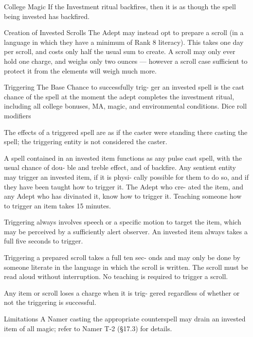 \begin{Chapter}{College Magic}
If  the  Investment  ritual  backfires,  then  it  is  as 
though the spell being invested has backfired. 

Creation  of  Invested  Scrolls  The  Adept  may 
instead  opt  to  prepare  a  scroll  (in  a  language  in 
which  they  have  a  minimum  of  Rank  8  literacy). 
This  takes  one  day  per  scroll,  and  costs  only  half 
the  usual  sum  to  create.  A  scroll  may  only  ever 
hold  one  charge,  and  weighs  only  two  ounces  — 
however  a  scroll  case  sufficient  to  protect  it  from 
the elements will weigh much more. 

Triggering  The  Base  Chance  to  successfully  trig-
ger an invested spell is the cast chance of the spell 
at the  moment the  adept  completes  the  investment 
ritual,  including  all  college  bonuses,  MA,  magic, 
and  environmental  conditions.  Dice  roll  modifiers 

The  effects  of  a  triggered  spell  are  as  if  the  caster 
were standing there casting the spell; the triggering 
entity is not considered the caster. 

A  spell  contained in  an  invested  item functions  as 
any pulse cast spell, with the usual chance of dou-
ble and treble effect, and of backfire. Any sentient 
entity  may  trigger  an  invested  item,  if  it  is  physi-
cally  possible  for  them  to  do  so,  and  if  they  have 
been taught how to trigger it. The  Adept who cre-
ated the item, and any Adept who has divinated it, 
know  how  to  trigger  it.  Teaching  someone  how  to 
trigger an item takes 15 minutes. 

Triggering  always  involves  speech  or  a  specific 
motion to target the item, which may be perceived 
by  a  sufficiently  alert  observer.  An  invested  item 
always takes a full five seconds to trigger. 

Triggering  a  prepared  scroll  takes  a  full  ten  sec-
onds and may only be done by someone literate in 
the  language  in  which  the  scroll  is  written.  The 
scroll  must be  read aloud  without interruption.  No 
teaching is required to trigger a scroll. 

Any  item  or  scroll  loses  a  charge  when  it  is  trig-
gered regardless of whether or not the triggering is 
successful. 

Limitations  A  Namer  casting  the  appropriate 
counterspell  may  drain  an  invested  item  of  all 
magic; refer to Namer T-2 (§17.3) for details. 

\end{Chapter}
